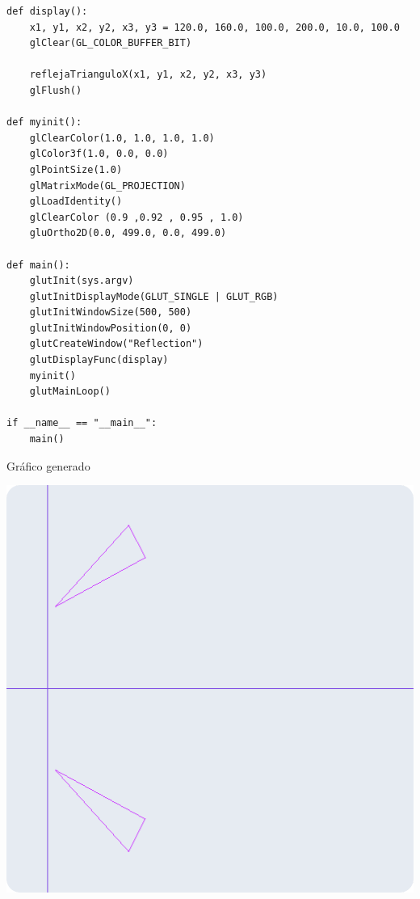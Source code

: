 \documentclass[a4paper]{article}
\begin{document}
\begin{center}
\begin{mycodebox}
\begin{lstlisting}
def display():
    x1, y1, x2, y2, x3, y3 = 120.0, 160.0, 100.0, 200.0, 10.0, 100.0
    glClear(GL_COLOR_BUFFER_BIT)

    reflejaTrianguloX(x1, y1, x2, y2, x3, y3)
    glFlush()

def myinit():
    glClearColor(1.0, 1.0, 1.0, 1.0)
    glColor3f(1.0, 0.0, 0.0)
    glPointSize(1.0)
    glMatrixMode(GL_PROJECTION)
    glLoadIdentity()
    glClearColor (0.9 ,0.92 , 0.95 , 1.0)
    gluOrtho2D(0.0, 499.0, 0.0, 499.0)

def main():
    glutInit(sys.argv)
    glutInitDisplayMode(GLUT_SINGLE | GLUT_RGB)
    glutInitWindowSize(500, 500)
    glutInitWindowPosition(0, 0)
    glutCreateWindow("Reflection")
    glutDisplayFunc(display)
    myinit()
    glutMainLoop()

if __name__ == "__main__":
    main()
\end{lstlisting}
\end{mycodebox}
\end{center}
\newpage
Gráfico generado\\
\begin{center}
\includegraphics[width=16cm]{src/2.png}
\end{center}
\newpage
\end{document}
